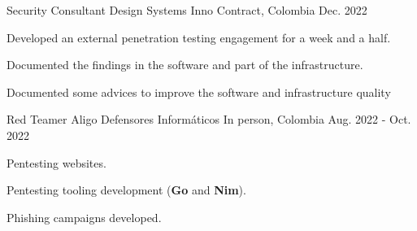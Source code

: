\begin{cventries}
  \cventry
  {Security Consultant} %
  {Design Systems Inno} %
  {Contract, Colombia} %
  {Dec. 2022} %
  {
    \begin{cvitems} %
      \item {Developed an external penetration testing engagement for a week and a half.}
      \item {Documented the findings in the software and part of the infrastructure.}
      \item {Documented some advices to improve the software and infrastructure quality}
    \end{cvitems}
  }

  \cventry
  {Red Teamer} %
  {Aligo Defensores Informáticos} %
  {In person, Colombia} %
  {Aug. 2022 - Oct. 2022} %
  {
    \begin{cvitems} %
      \item {Pentesting websites.}
      \item {Pentesting tooling development (\textbf{Go} and \textbf{Nim}).}
      \item {Phishing campaigns developed.}
    \end{cvitems}
  }


\end{cventries}

